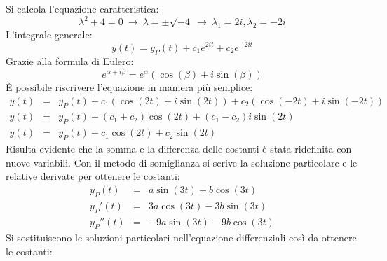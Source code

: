 \documentclass[a4paper]{article}
\begin{document}
	\noindent
	Si calcola l'equazione caratteristica:
	\begin{equation*}
		\lambda^{2} + 4 = 0 \: \rightarrow \: \lambda = \pm\sqrt{-4} \: \rightarrow \: \lambda_{1} = 2i, \lambda_{2} = -2i
	\end{equation*}
	L'integrale generale:
	\begin{equation*}
		y\left(t\right) = y_{P}\left(t\right) + c_{1}e^{2i t} + c_{2}e^{-2it}
	\end{equation*}
	Grazie alla formula di Eulero:
	\begin{equation*}
		e^{\alpha + i\beta} = e^{\alpha}\left(\cos\left(\beta\right) + i\sin\left(\beta\right)\right)
	\end{equation*}
	È possibile riscrivere l'equazione in maniera più semplice:
	\begin{equation*}
		\begin{array}{rcl}
			y\left(t\right) &=& y_{P}\left(t\right) +
			c_{1}\left(\cos\left(2t\right)+i\sin\left(2t\right)\right) + 
			c_{2}\left(\cos\left(-2t\right)+i\sin\left(-2t\right)\right) \\ [.5em]
			y\left(t\right) &=& y_{P}\left(t\right) +
			\left(c_{1}+c_{2}\right)\cos\left(2t\right) + \left(c_{1}-c_{2}\right)i\sin\left(2t\right) \\ [.5em]
			y\left(t\right) &=& y_{P}\left(t\right) +
			c_{1}\cos\left(2t\right) + c_{2}\sin\left(2t\right) 
		\end{array}
	\end{equation*}
	Risulta evidente che la somma e la differenza delle costanti è stata ridefinita con nuove variabili. Con il metodo di somiglianza si scrive la soluzione particolare e le relative derivate per ottenere le costanti:
	\begin{equation*}
		\begin{array}{rcl}
			y_{P}\left(t\right) &=& a\sin\left(3t\right) + b\cos\left(3t\right) \\ [.3em]
			y_{P}'\left(t\right) &=& 3a\cos\left(3t\right) - 3b\sin\left(3t\right) \\ [.3em]
			y_{P}''\left(t\right) &=& -9a\sin\left(3t\right) - 9b\cos\left(3t\right) 
		\end{array}
	\end{equation*}
	Si sostituiscono le soluzioni particolari nell'equazione differenziali così da ottenere le costanti:
\end{document}
